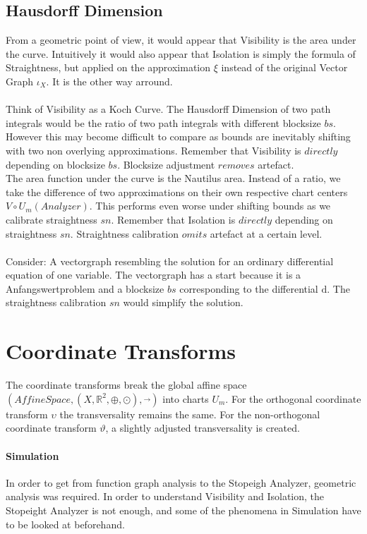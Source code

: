 \documentclass{report}
\begin{document}
\section{Hausdorff Dimension}

From a geometric point of view, it would appear that Visibility is the area under the curve. Intuitively it would also appear that Isolation is simply the formula of Straightness, but applied on the approximation $\xi$ instead of the original Vector Graph $\iota_{X}$. It is the other way arround.\\\\
Think of Visibility as a Koch Curve. The Hausdorff Dimension of two path integrals would be the ratio of two path integrals with different blocksize $bs$. However this may become difficult to compare as bounds are inevitably shifting with two non overlying approximations. Remember that Visibility is $directly$ depending on blocksize $bs$. Blocksize adjustment $removes$ artefact.\\
The area function under the curve is the Nautilus area. Instead of a ratio, we take the difference of two approximations on their own respective chart centers $V\circ U_{m}(Analyzer)$. This performs even worse under shifting bounds as we calibrate straightness $sn$. Remember that Isolation is $directly$ depending on straightness $sn$. Straightness calibration $omits$ artefact at a certain level.\\\\
Consider: A vectorgraph resembling the solution for an ordinary differential equation of one variable. The vectorgraph has a start because it is a Anfangswertproblem and a blocksize $bs$ corresponding to the differential $\mathrm{d}$. The straightness calibration $sn$ would simplify the solution.

\chapter{Coordinate Transforms}
The coordinate transforms break the global affine space $(AffineSpace,(X,\mathbb{R}^2,\oplus,\odot),\overrightarrow{\text{ }})$ into charts $U_{m}$. For the orthogonal coordinate transform $\upsilon$ the transversality remains the same. For the non-orthogonal coordinate transform $\vartheta$, a slightly adjusted transversality is created.

\subsubsection*{Simulation}
In order to get from function graph analysis to the Stopeigh Analyzer, geometric analysis was required. In order to understand Visibility and Isolation, the Stopeight Analyzer is not enough, and some of the phenomena in Simulation have to be looked at beforehand.
\end{document}
